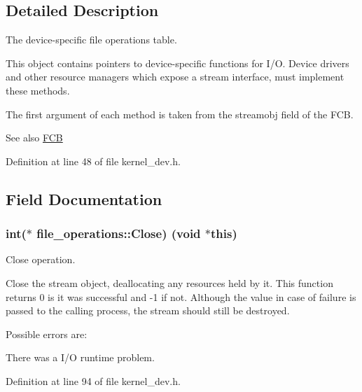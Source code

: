 \subsection{Detailed Description}
The device-\/specific file operations table. 

This object contains pointers to device-\/specific functions for I/O. Device drivers and other resource managers which expose a stream interface, must implement these methods.

The first argument of each method is taken from the \textquotesingle{}streamobj\textquotesingle{} field of the F\+CB. \begin{DoxySeeAlso}{See also}
\hyperlink{group__rlists_ga60c6c294fa1d8ea73ed270404fe5c17d}{F\+CB} 
\end{DoxySeeAlso}


Definition at line 48 of file kernel\+\_\+dev.\+h.



\subsection{Field Documentation}
\subsubsection[{\texorpdfstring{Close}{Close}}]{\setlength{\rightskip}{0pt plus 5cm}int($\ast$ file\+\_\+operations\+::\+Close) (void $\ast$this)}\hypertarget{structfile__operations_a66cfe706a1a29e3e58c7694dbd801b0f}{}\label{structfile__operations_a66cfe706a1a29e3e58c7694dbd801b0f}


Close operation. 

Close the stream object, deallocating any resources held by it. This function returns 0 is it was successful and -\/1 if not. Although the value in case of failure is passed to the calling process, the stream should still be destroyed.

Possible errors are\+:
\begin{DoxyItemize}
\item There was a I/O runtime problem. 
\end{DoxyItemize}

Definition at line 94 of file kernel\+\_\+dev.\+h.

